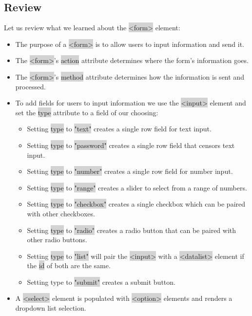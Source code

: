 \documentclass[11pt]{article}
\begin{document}
\subsection{Review}
Let us review what we learned about the \colorbox{lightgray}{<form>} element:
\begin{itemize}[leftmargin = *]
\item The purpose of a \colorbox{lightgray}{<form>} is to allow users to input information and send it.
\item The \colorbox{lightgray}{<form>}'s \colorbox{lightgray}{action} attribute determines where the form’s information goes.
\item The \colorbox{lightgray}{<form>}'s \colorbox{lightgray}{method} attribute determines how the information is sent and processed.
\item To add fields for users to input information we use the \colorbox{lightgray}{<input>} element and set the \colorbox{lightgray}{type} attribute to a field of our choosing:
\begin{itemize}[leftmargin = *]
\item Setting \colorbox{lightgray}{type} to \colorbox{lightgray}{"text"} creates a single row field for text input.
\item Setting \colorbox{lightgray}{type} to \colorbox{lightgray}{"password"} creates a single row field that censors text input.
\item Setting \colorbox{lightgray}{type} to \colorbox{lightgray}{"number"} creates a single row field for number input.
\item Setting \colorbox{lightgray}{type} to \colorbox{lightgray}{"range"} creates a slider to select from a range of numbers.
\item Setting \colorbox{lightgray}{type} to \colorbox{lightgray}{"checkbox"} creates a single checkbox which can be paired with other checkboxes.
\item Setting \colorbox{lightgray}{type} to \colorbox{lightgray}{"radio"} creates a radio button that can be paired with other radio buttons.
\item Setting \colorbox{lightgray}{type} to \colorbox{lightgray}{"list"} will pair the \colorbox{lightgray}{<input>} with a \colorbox{lightgray}{<datalist>} element if the \colorbox{lightgray}{id} of both are the same.
\item Setting type to \colorbox{lightgray}{"submit"} creates a submit button.
\end{itemize}
\item A \colorbox{lightgray}{<select>} element is populated with \colorbox{lightgray}{<option>} elements and renders a dropdown list selection.

\end{itemize}
\end{document}
